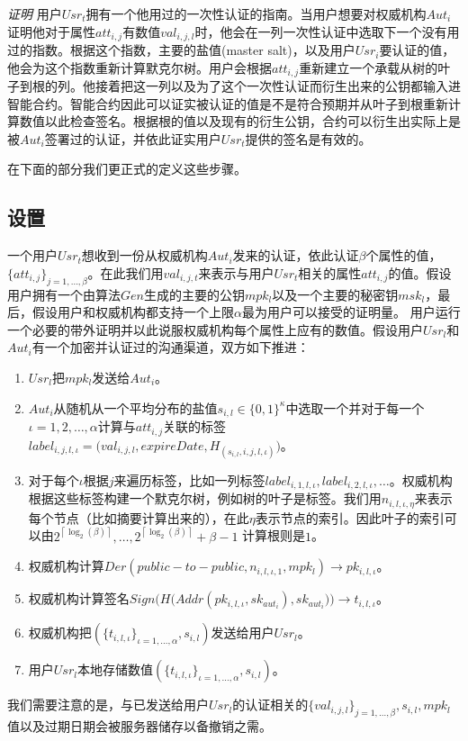 \documentclass[UTF8]{ctexart}
\def\lc{\left\lceil}
\def\rc{\right\rceil}
\begin{document}
\noindent \textit{证明} \hspace{0.1cm} 用户$Usr_t$拥有一个他用过的一次性认证的指南。当用户想要对权威机构$Aut_i$证明他对于属性$att_{i, j}$有数值$val_{i, j, l}$时，他会在一列一次性认证中选取下一个没有用过的指数。根据这个指数，主要的盐值(master salt)，以及用户$Usr_i$要认证的值，他会为这个指数重新计算默克尔树。用户会根据$att_{i,j}$重新建立一个承载从树的叶子到根的列。他接着把这一列以及为了这个一次性认证而衍生出来的公钥都输入进智能合约。智能合约因此可以证实被认证的值是不是符合预期并从叶子到根重新计算数值以此检查签名。根据根的值以及现有的衍生公钥，合约可以衍生出实际上是被$Aut_i$签署过的认证，并依此证实用户$Usr_t$提供的签名是有效的。

在下面的部分我们更正式的定义这些步骤。
\subsection{设置}
一个用户$Usr_t$想收到一份从权威机构$Aut_i$发来的认证，依此认证$\beta$个属性的值，$\{att_{i, j}\}_{j = 1, \ldots, \beta}$。在此我们用$val_{i, j , t}$来表示与用户$Usr_t$相关的属性$att_{i, j}$的值。假设用户拥有一个由算法$Gen$生成的主要的公钥$mpk_l$以及一个主要的秘密钥$msk_l$，最后，假设用户和权威机构都支持一个上限$\alpha$最为用户可以接受的证明量。
用户运行一个必要的带外证明并以此说服权威机构每个属性上应有的数值。假设用户$Usr_l$和$Aut_i$有一个加密并认证过的沟通渠道，双方如下推进：
\begin{enumerate}
\item $Usr_l$把$mpk_l$发送给$Aut_i$。
\item $Aut_i$从随机从一个平均分布的盐值$s_{i, l} \in \{0,1\}^\kappa$中选取一个并对于每一个$\iota = 1, 2, \ldots, \alpha$计算与$att_{i, j}$关联的标签$label_{i,j, l, \iota} = \big(val_{i,j,l}, expireDate, H_{(s_{i, l}, i, j, l, \iota)}\big)$。
\item 对于每个$\iota$根据$j$来遍历标签，比如一列标签$label_{i,1,l,\iota}, label_{i,2,l,\iota}, \ldots$。权威机构根据这些标签构建一个默克尔树，例如树的叶子是标签。我们用$n_{i, l, \iota, \eta}$来表示每个节点（比如摘要计算出来的），在此$\eta$表示节点的索引。因此叶子的索引可以由$2^{\lc\log_2(\beta)\rc},\ldots,2^{\lc\log_2(\beta)\rc} + \beta - 1$ 计算根则是$1$。
\item 权威机构计算$Der(public-to-public, n_{i, l, \iota, 1},mpk_l) \to pk_{i, l, \iota}$。
\item 权威机构计算签名$Sign\big(H\big(Addr(pk_{i, l,\iota}, sk_{aut_i}),sk_{aut_i}\big)\big) \to t_{i, l, \iota}$。
\item 权威机构把$(\{t_{i, l,\iota}\}_{\iota = 1, \ldots, \alpha}, s_{i, l})$发送给用户$Usr_l$。
\item 用户$Usr_l$本地存储数值$(\{t_{i, l,\iota}\}_{\iota = 1, \ldots, \alpha}, s_{i, l})$。
\end{enumerate}
我们需要注意的是，与已发送给用户$Usr_l$的认证相关的$\{val_{i, j, l}\}_{j = 1, \ldots, \beta}, s_{i, l}, mpk_l$值以及过期日期会被服务器储存以备撤销之需。
\end{document}
